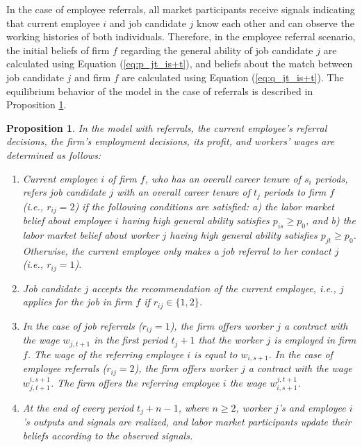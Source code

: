 \documentclass[12pt]{article}
\newtheorem{proposition}{Proposition}
\begin{document}
In the case of employee referrals, all market participants receive signals indicating that current employee $i$ and job candidate $j$ know each other and can observe the working histories of both individuals. Therefore, in the employee referral scenario, the initial beliefs of firm $f$ regarding the general ability of job candidate $j$ are calculated using Equation (\ref{eq:p_jt_is+t}), and beliefs about the match between job candidate $j$ and firm $f$ are calculated using Equation (\ref{eq:q_jt_is+t}). The equilibrium behavior of the model in the case of referrals is described in Proposition \ref{prop:equil_referrals}.

\begin{proposition}\label{prop:equil_referrals}
In the model with referrals, the current employee's referral decisions, the firm's employment decisions, its profit, and workers' wages are determined as follows:

\begin{enumerate}[label={\roman*})]
\item Current employee $i$ of firm $f$, who has an overall career tenure of $s_i$ periods, refers job candidate $j$ with an overall career tenure of $t_j$ periods to firm $f$ (i.e., $r_{ij} = 2$) if the following conditions are satisfied: a) the labor market belief about employee $i$ having high general ability satisfies $p_{is} \geq p_0$, and b) the labor market belief about worker $j$ having high general ability satisfies $p_{jt} \geq p_0$. Otherwise, the current employee only makes a job referral to her contact $j$ (i.e., $r_{ij} = 1$).

\item Job candidate $j$ accepts the recommendation of the current employee, i.e., $j$ applies for the job in firm $f$ if $r_{ij} \in \lbrace 1,2 \rbrace$.

\item In the case of job referrals ($r_{ij} = 1$), the firm offers worker $j$ a contract with the wage $w_{j,t+1}$ in the first period $t_j+1$ that the worker $j$ is employed in firm $f$. The wage of the referring employee $i$ is equal to $w_{i,s+1}$. In the case of employee referrals ($r_{ij} = 2$), the firm offers worker $j$ a contract with the wage $w_{j,t+1}^{i,s+1}$. The firm offers the referring employee $i$ the wage $w^{j,t+1}_{i,s+1}$.

\item At the end of every period $t_j + n-1$, where $n \geq 2$, worker $j$'s and employee $i$'s outputs and signals are realized, and labor market participants update their beliefs according to the observed signals.


\end{enumerate}
\end{proposition}
\end{document}
